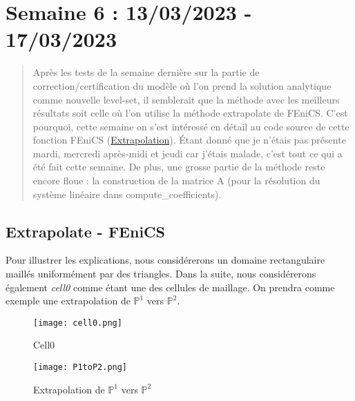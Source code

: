 \section{Semaine 6 : 13/03/2023 - 17/03/2023}
\graphicspath{{semaines/semaine_6/images/}}

\begin{abstract}
	Après les tests de la semaine dernière sur la partie de correction/certification du modèle où l'on prend la solution analytique comme nouvelle level-set, il semblerait que la méthode avec les meilleurs résultats soit celle où l'on utilise la méthode extrapolate de FEniCS. C'est pourquoi, cette semaine on s'est intéressé en détail au code source de cette fonction FEniCS (\href{https://fenics.readthedocs.io/projects/dolfin/en/2017.2.0/apis/api_adaptivity.html#extrapolation}{Extrapolation}). Étant donné que je n'étais pas présente mardi, mercredi après-midi et jeudi car j'étais malade, c'est tout ce qui a été fait cette semaine. De plus, une grosse partie de la méthode reste encore floue : la construction de la matrice A (pour la résolution du système linéaire dans compute\_coefficients).
\end{abstract}

\subsection{Extrapolate - FEniCS \faBookmarkO}

Pour illustrer les explications, nous considérerons un domaine rectangulaire maillés uniformément par des triangles. Dans la suite, nous considérerons également \textit{cell0} comme étant une des cellules de maillage. On prendra comme exemple une extrapolation de $\mathbb{P}^1$ vers $\mathbb{P}^2$. 

\begin{minipage}{0.48\linewidth}
	\begin{figure}[H]
		\centering
		\texttt{[image: cell0.png]}
		\caption{Cell0}
	\end{figure}
\end{minipage}
\begin{minipage}{0.48\linewidth}
	\begin{figure}[H]
		\centering
		\texttt{[image: P1toP2.png]}
		\caption{Extrapolation de $\mathbb{P}^1$ vers $\mathbb{P}^2$}
	\end{figure}
\end{minipage} \; \\


